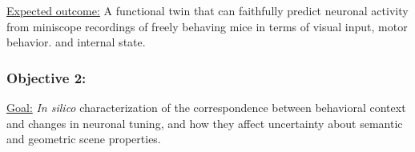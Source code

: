 \documentclass[COG,11pt]{ercgrant}
\begin{document}
\underline{Expected outcome:} A functional twin that can faithfully predict neuronal activity from miniscope recordings of freely behaving mice in terms of visual input, motor behavior.
and internal state.


\subsubsection{Objective 2:  \otwotitle\hfill{}}
\underline{Goal:} \textit{In silico} characterization of the correspondence between behavioral context and changes in neuronal tuning, and how they affect uncertainty about semantic and geometric scene properties. 
\end{document}
